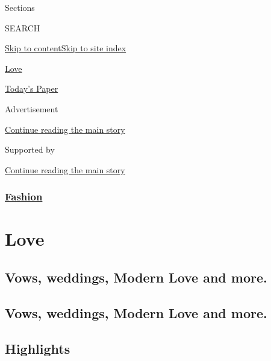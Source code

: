Sections

SEARCH

\protect\hyperlink{site-content}{Skip to
content}\protect\hyperlink{site-index}{Skip to site index}

\href{https://www.nytimes3xbfgragh.onion/section/fashion/weddings}{Love}

\href{https://myaccount.nytimes3xbfgragh.onion/auth/login?response_type=cookie\&client_id=vi}{}

\href{https://www.nytimes3xbfgragh.onion/section/todayspaper}{Today's
Paper}

Advertisement

\protect\hyperlink{after-top}{Continue reading the main story}

Supported by

\protect\hyperlink{after-sponsor}{Continue reading the main story}

\hypertarget{fashion}{%
\subsubsection{\texorpdfstring{\href{/section/fashion}{Fashion}}{Fashion}}\label{fashion}}

\hypertarget{love}{%
\section{Love}\label{love}}

\hypertarget{vows-weddings-modern-love-and-more}{%
\subsection{Vows, weddings, Modern Love and
more.}\label{vows-weddings-modern-love-and-more}}

\hypertarget{vows-weddings-modern-love-and-more-1}{%
\subsection{Vows, weddings, Modern Love and
more.}\label{vows-weddings-modern-love-and-more-1}}

\hypertarget{highlights}{%
\subsection{Highlights}\label{highlights}}

